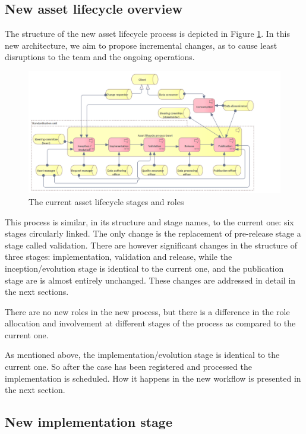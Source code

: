 	\subsection{New asset lifecycle overview}
	\label{sec:lifecycle-new}	
	
	The structure of the new asset lifecycle process is depicted in Figure \ref{fig:lifecycle-new}. In this new architecture, we aim to propose incremental changes, as to cause least disruptions to the team and the ongoing operations. 

	\begin{figure}[h]
		\centering
		\includegraphics[width=1.05\textwidth]{images/business/Lifecycle (new).png}
		\caption{The current asset lifecycle stages and roles}
		\label{fig:lifecycle-new}
	\end{figure}
	
	This process is similar, in its structure and stage names, to the current one: six stages circularly linked. The only change is the replacement of pre-release stage a stage called validation. There are however significant changes in the structure of three stages: implementation, validation and release, while the inception/evolution stage is identical to the current one, and the publication stage are is almost entirely unchanged. These changes are addressed in detail in the next sections.
		
	There are no new roles in the new process, but there is a difference in the role allocation and involvement at different stages of the process as compared to the current one. 
	
	As mentioned above, the implementation/evolution stage is identical to the current one. So after the case has been registered and processed the implementation is scheduled. How it happens in the new workflow is presented in the next section. 
			
	\subsection{New implementation stage}
	\label{sec:implementation-new}

